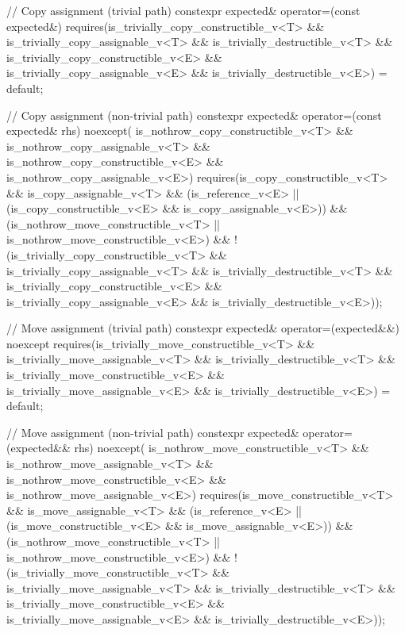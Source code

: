 \begin{codeblock}
{{    // Copy assignment (trivial path)
    constexpr expected& operator=(const expected&)
      requires(is_trivially_copy_constructible_v<T> &&
               is_trivially_copy_assignable_v<T> && is_trivially_destructible_v<T> &&
               is_trivially_copy_constructible_v<E> &&
               is_trivially_copy_assignable_v<E> && is_trivially_destructible_v<E>)
    = default;

    // Copy assignment (non-trivial path)
    constexpr expected& operator=(const expected& rhs) noexcept(
        is_nothrow_copy_constructible_v<T> && is_nothrow_copy_assignable_v<T> &&
        is_nothrow_copy_constructible_v<E> && is_nothrow_copy_assignable_v<E>)
      requires(is_copy_constructible_v<T> && is_copy_assignable_v<T> &&
               (is_reference_v<E> ||
                (is_copy_constructible_v<E> && is_copy_assignable_v<E>)) &&
               (is_nothrow_move_constructible_v<T> ||
                is_nothrow_move_constructible_v<E>) &&
               !(is_trivially_copy_constructible_v<T> &&
                 is_trivially_copy_assignable_v<T> && is_trivially_destructible_v<T> &&
                 is_trivially_copy_constructible_v<E> &&
                 is_trivially_copy_assignable_v<E> && is_trivially_destructible_v<E>));

    // Move assignment (trivial path)
    constexpr expected& operator=(expected&&) noexcept
      requires(is_trivially_move_constructible_v<T> &&
               is_trivially_move_assignable_v<T> && is_trivially_destructible_v<T> &&
               is_trivially_move_constructible_v<E> &&
               is_trivially_move_assignable_v<E> && is_trivially_destructible_v<E>)
    = default;

    // Move assignment (non-trivial path)
    constexpr expected& operator=(expected&& rhs) noexcept(
        is_nothrow_move_constructible_v<T> && is_nothrow_move_assignable_v<T> &&
        is_nothrow_move_constructible_v<E> && is_nothrow_move_assignable_v<E>)
      requires(is_move_constructible_v<T> && is_move_assignable_v<T> &&
               (is_reference_v<E> ||
                (is_move_constructible_v<E> && is_move_assignable_v<E>)) &&
               (is_nothrow_move_constructible_v<T> ||
                is_nothrow_move_constructible_v<E>) &&
               !(is_trivially_move_constructible_v<T> &&
                 is_trivially_move_assignable_v<T> && is_trivially_destructible_v<T> &&
                 is_trivially_move_constructible_v<E> &&
                 is_trivially_move_assignable_v<E> && is_trivially_destructible_v<E>));

}}
\end{codeblock}

